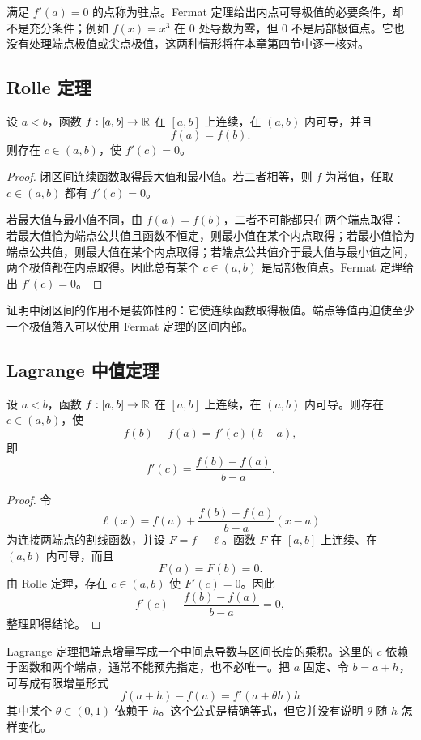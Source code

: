 满足 \(f'(a)=0\) 的点称为驻点。Fermat 定理给出内点可导极值的必要条件，却不是充分条件；例如 \(f(x)=x^3\) 在 \(0\) 处导数为零，但 \(0\) 不是局部极值点。它也没有处理端点极值或尖点极值，这两种情形将在本章第四节中逐一核对。

\subsection{Rolle 定理}

\begin{theorem}[Rolle 定理]
\label{thm:rolle}
设 \(a<b\)，函数 \(f:[a,b]\to\mathbb{R}\) 在 \([a,b]\) 上连续，在 \((a,b)\) 内可导，并且
\[
 f(a)=f(b).
\]
则存在 \(c\in(a,b)\)，使 \(f'(c)=0\)。
\end{theorem}

\begin{proof}
闭区间连续函数取得最大值和最小值。若二者相等，则 \(f\) 为常值，任取 \(c\in(a,b)\) 都有 \(f'(c)=0\)。

若最大值与最小值不同，由 \(f(a)=f(b)\)，二者不可能都只在两个端点取得：若最大值恰为端点公共值且函数不恒定，则最小值在某个内点取得；若最小值恰为端点公共值，则最大值在某个内点取得；若端点公共值介于最大值与最小值之间，两个极值都在内点取得。因此总有某个 \(c\in(a,b)\) 是局部极值点。Fermat 定理给出 \(f'(c)=0\)。
\end{proof}

证明中闭区间的作用不是装饰性的：它使连续函数取得极值。端点等值再迫使至少一个极值落入可以使用 Fermat 定理的区间内部。

\subsection{Lagrange 中值定理}

\begin{theorem}
\label{thm:lagrange-mvt}
设 \(a<b\)，函数 \(f:[a,b]\to\mathbb{R}\) 在 \([a,b]\) 上连续，在 \((a,b)\) 内可导。则存在 \(c\in(a,b)\)，使
\[
 f(b)-f(a)=f'(c)(b-a),
\]
即
\[
 f'(c)=\frac{f(b)-f(a)}{b-a}.
\]
\end{theorem}

\begin{proof}
令
\[
 \ell(x)=f(a)+\frac{f(b)-f(a)}{b-a}(x-a)
\]
为连接两端点的割线函数，并设 \(F=f-\ell\)。函数 \(F\) 在 \([a,b]\) 上连续、在 \((a,b)\) 内可导，而且
\[
 F(a)=F(b)=0.
\]
由 Rolle 定理，存在 \(c\in(a,b)\) 使 \(F'(c)=0\)。因此
\[
 f'(c)-\frac{f(b)-f(a)}{b-a}=0,
\]
整理即得结论。
\end{proof}

Lagrange 定理把端点增量写成一个中间点导数与区间长度的乘积。这里的 \(c\) 依赖于函数和两个端点，通常不能预先指定，也不必唯一。把 \(a\) 固定、令 \(b=a+h\)，可写成有限增量形式
\[
 f(a+h)-f(a)=f'(a+\theta h)h
\]
其中某个 \(\theta\in(0,1)\) 依赖于 \(h\)。这个公式是精确等式，但它并没有说明 \(\theta\) 随 \(h\) 怎样变化。

